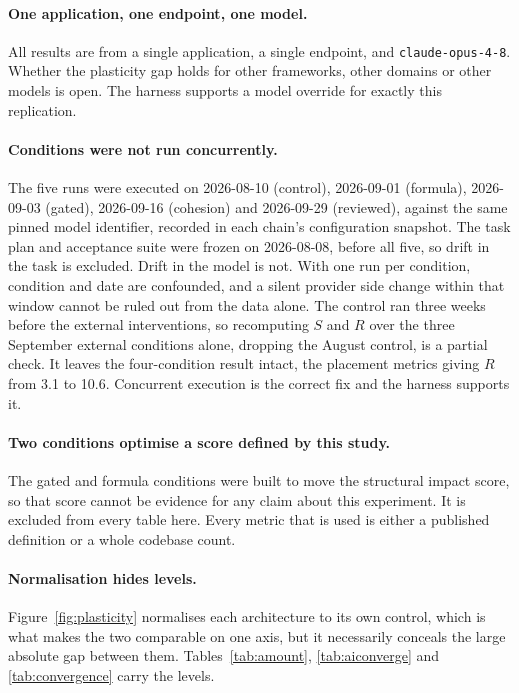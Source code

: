 \documentclass[11pt,a4paper]{article}
\begin{document}
\paragraph{One application, one endpoint, one model.} All results are from a
single application, a single endpoint, and \texttt{claude-opus-4-8}. Whether the
plasticity gap holds for other frameworks, other domains or other models is open.
The harness supports a model override for exactly this replication.

\paragraph{Conditions were not run concurrently.} The five runs were executed on
2026-08-10 (control), 2026-09-01 (formula), 2026-09-03 (gated), 2026-09-16
(cohesion) and 2026-09-29 (reviewed), against the same pinned model identifier,
recorded in each chain's configuration snapshot. The task plan and acceptance
suite were frozen on 2026-08-08, before all five, so drift in the task is
excluded. Drift in the model is not. With one run per condition, condition and
date are confounded, and a silent provider side change within that window cannot
be ruled out from the data alone. The control ran three weeks before the external
interventions, so recomputing $S$ and $R$ over the three September external
conditions alone, dropping the August control, is a partial check. It leaves the
four-condition result intact, the placement metrics giving $R$ from 3.1 to 10.6.
Concurrent execution is the correct fix and the harness supports it.

\paragraph{Two conditions optimise a score defined by this study.} The gated and
formula conditions were built to move the structural impact score, so that score
cannot be evidence for any claim about this experiment. It is excluded from every
table here. Every metric that is used is either a published definition or a whole
codebase count.

\paragraph{Normalisation hides levels.} Figure~\ref{fig:plasticity} normalises
each architecture to its own control, which is what makes the two comparable on
one axis, but it necessarily conceals the large absolute gap between them.
Tables~\ref{tab:amount}, \ref{tab:aiconverge} and \ref{tab:convergence} carry the
levels.
\end{document}
